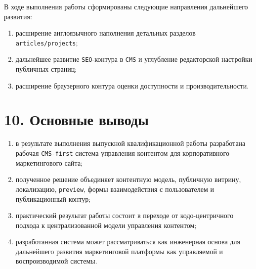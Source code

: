 \documentclass[12pt,a4paper]{article}
\begin{document}
В ходе выполнения работы сформированы следующие направления дальнейшего развития:
\begin{enumerate}
  \item расширение англоязычного наполнения детальных разделов
  \texttt{articles/projects};
  \item дальнейшее развитие \texttt{SEO}-контура в \texttt{CMS} и углубление редакторской настройки
  публичных страниц;
  \item расширение браузерного контура оценки доступности и производительности.
\end{enumerate}

\section*{10. Основные выводы}

\begin{enumerate}
  \item в результате выполнения выпускной квалификационной работы разработана рабочая
  \texttt{CMS-first} система управления контентом для корпоративного маркетингового сайта;
  \item полученное решение объединяет контентную модель, публичную витрину, локализацию,
  \texttt{preview}, формы взаимодействия с пользователем и публикационный контур;
  \item практический результат работы состоит в переходе от кодо-центричного
  подхода к централизованной модели управления контентом;
  \item разработанная система может рассматриваться как инженерная основа для дальнейшего
  развития маркетинговой платформы как управляемой и воспроизводимой системы.
\end{enumerate}
\end{document}
